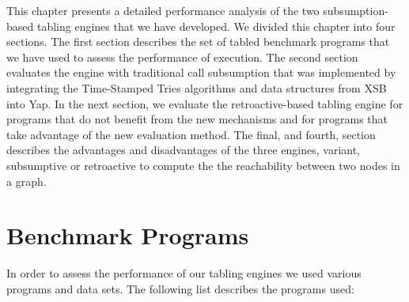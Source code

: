This chapter presents a detailed performance analysis of the two subsumption-based tabling engines
that we have developed. We divided this chapter into four sections. The first section describes the
set of tabled benchmark programs that we have used to assess the performance of execution. The second
section evaluates the engine with traditional call subsumption that was implemented by integrating the
Time-Stamped Tries algorithms and data structures from XSB into Yap. In the next section, we evaluate
the retroactive-based tabling engine for programs that do not benefit from the new mechanisms and
for programs that take advantage of the new evaluation method. The final, and fourth, section describes
the advantages and disadvantages of the three engines, variant, subsumptive or retroactive to
compute the the reachability between two nodes in a graph.

\section{Benchmark Programs}

In order to assess the performance of our tabling engines we used various programs and data sets.
The following list describes the programs used:

